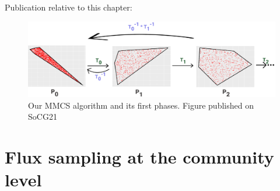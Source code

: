 Publication relative to this chapter: \cite{chalki2021SoCG}


\begin{figure}[!htbp]
   \includegraphics[width=1.0\columnwidth]{figures/sampling_extra_phase_croped.png}
   \caption{Our MMCS algorithm and its first phases. Figure published on SoCG21}
   \label{fig:mmcs}
\end{figure}


\section{Flux sampling at the community level}



